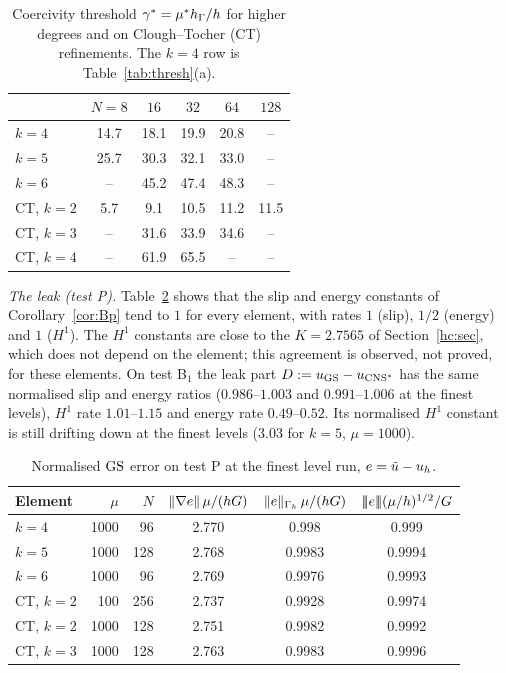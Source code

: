 \begin{table}[t]
\centering
\caption{Coercivity threshold $\gamma^\ast=\mu^\ast h_\Gamma/h$ for higher degrees and on Clough--Tocher (CT) refinements. The $k=4$ row is Table~\ref{tab:thresh}(a).}\label{tab:threshv3}
\begin{tabular}{lccccc}
\toprule
 & $N=8$ & $16$ & $32$ & $64$ & $128$\\
\midrule
$k=4$ & 14.7 & 18.1 & 19.9 & 20.8 & --\\
$k=5$ & 25.7 & 30.3 & 32.1 & 33.0 & --\\
$k=6$ & -- & 45.2 & 47.4 & 48.3 & --\\
CT, $k=2$ & 5.7 & 9.1 & 10.5 & 11.2 & 11.5\\
CT, $k=3$ & -- & 31.6 & 33.9 & 34.6 & --\\
CT, $k=4$ & -- & 61.9 & 65.5 & -- & --\\
\bottomrule
\end{tabular}
\end{table}

\emph{The leak (test P).} Table~\ref{tab:Pv3} shows that the slip and energy constants of Corollary~\ref{cor:Bp} tend to $1$ for every element, with rates $1$ (slip), $1/2$ (energy) and $1$ ($H^1$). The $H^1$ constants are close to the $K=2.7565$ of Section~\ref{hc:sec}, which does not depend on the element; this agreement is observed, not proved, for these elements. On test B$_1$ the leak part $D:=u_{\mathrm{GS}}-u_{\mathrm{CNS}^\ast}$ has the same normalised slip and energy ratios ($0.986$--$1.003$ and $0.991$--$1.006$ at the finest levels), $H^1$ rate $1.01$--$1.15$ and energy rate $0.49$--$0.52$. Its normalised $H^1$ constant is still drifting down at the finest levels ($3.03$ for $k=5$, $\mu=1000$).

\begin{table}[t]
\centering
\caption{Normalised $\mathrm{GS}$ error on test P at the finest level run, $e=\tilde u-u_h$.}\label{tab:Pv3}
\begin{tabular}{lrrccc}
\toprule
Element & $\mu$ & $N$ & $\lVert \nabla e\rVert\,\mu/(hG)$ & $\lVert e\rVert_{\Gamma_h}\,\mu/(hG)$ & $|\!|\!|e|\!|\!|(\mu/h)^{1/2}/G$\\
\midrule
$k=4$ & 1000 & 96 & 2.770 & 0.998 & 0.999\\
$k=5$ & 1000 & 128 & 2.768 & 0.9983 & 0.9994\\
$k=6$ & 1000 & 96 & 2.769 & 0.9976 & 0.9993\\
CT, $k=2$ & 100 & 256 & 2.737 & 0.9928 & 0.9974\\
CT, $k=2$ & 1000 & 128 & 2.751 & 0.9982 & 0.9992\\
CT, $k=3$ & 1000 & 128 & 2.763 & 0.9983 & 0.9996\\
\bottomrule
\end{tabular}
\end{table}

